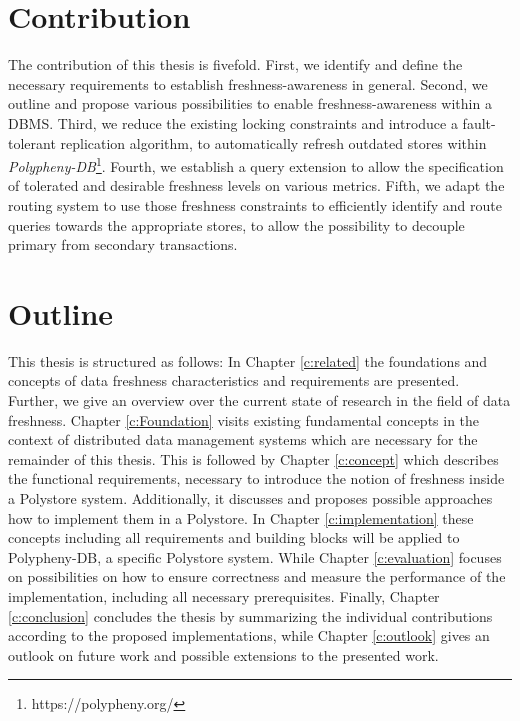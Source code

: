
\section{Contribution}
The contribution of this thesis is fivefold. First, we identify and define the necessary requirements to establish freshness-awareness in general.
Second, we outline and propose various possibilities to enable freshness-awareness within a DBMS. Third, we reduce the existing locking constraints and 
introduce a fault-tolerant replication algorithm, to automatically refresh outdated stores within \emph{Polypheny-DB}\footnote{https://polypheny.org/}. 
Fourth, we establish a query extension to allow the specification of tolerated and desirable freshness levels 
on various metrics. Fifth, we adapt the routing system to use those freshness constraints to efficiently identify and route queries towards the appropriate stores, 
to allow the possibility to decouple primary from secondary transactions.




\section{Outline}
This thesis is structured as follows:
In Chapter \ref{c:related} the foundations and concepts of data freshness characteristics and requirements are presented.
Further, we give an overview over the current state of research in the field of data freshness. 
Chapter \ref{c:Foundation} visits existing fundamental concepts in the context of distributed data management systems 
which are necessary for the remainder of this thesis. 
This is followed by Chapter \ref{c:concept} which describes the functional requirements, necessary to introduce the notion of freshness inside a Polystore system. 
Additionally, it discusses and proposes possible approaches how to implement them in a Polystore. 
In Chapter \ref{c:implementation} these concepts including all requirements and building blocks will be applied to Polypheny-DB, a specific Polystore system.
While Chapter \ref{c:evaluation} focuses on possibilities on how to ensure correctness and measure the performance of the implementation, including all necessary prerequisites.
Finally, Chapter \ref{c:conclusion} concludes the thesis by summarizing the individual contributions according to the proposed
implementations, while Chapter \ref{c:outlook} gives an outlook on future work and possible extensions to the presented work.


